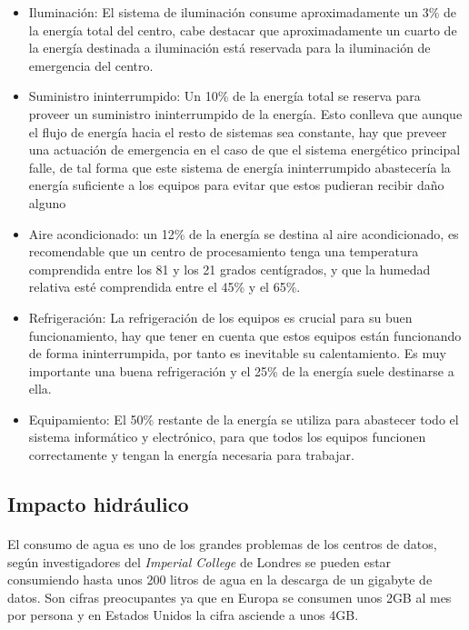 \documentclass[12pt]{article}
\begin{document}
        \begin{itemize}
        \item Iluminación: El sistema de iluminación consume aproximadamente un 3\% de la energía total del centro, cabe destacar que aproximadamente un cuarto de la energía destinada a iluminación está reservada para la iluminación de emergencia del centro.
        \item Suministro ininterrumpido: Un 10\% de la energía total se reserva para proveer un suministro ininterrumpido de la energía. Esto conlleva que aunque el flujo de energía hacia el resto de sistemas sea constante, hay que preveer una actuación de emergencia en el caso de que el sistema energético principal falle, de tal forma que este sistema de energía ininterrumpido abastecería la energía suficiente a los equipos para evitar que estos pudieran recibir daño alguno
        \item Aire acondicionado: un 12\% de la energía se destina al aire acondicionado, es recomendable que un centro de procesamiento tenga una temperatura comprendida entre los 81 y los 21 grados centígrados, y que la humedad relativa esté comprendida entre el 45\% y el 65\%.
        \item Refrigeración: La refrigeración de los equipos es crucial para su buen funcionamiento, hay que tener en cuenta que estos equipos están funcionando de forma ininterrumpida, por tanto es inevitable su calentamiento. Es muy importante una buena refrigeración y el 25\% de la energía suele destinarse a ella.
        \item Equipamiento: El 50\% restante de la energía se utiliza para abastecer todo el sistema informático y electrónico, para que todos los equipos funcionen correctamente y tengan la energía necesaria para trabajar.
        \end{itemize}
        
	  \subsection{Impacto hidráulico}
	  	\paragraph{}
		El consumo de agua es uno de los grandes problemas de los centros de datos, según investigadores del \textit{Imperial College} de Londres se pueden estar consumiendo hasta unos 200 litros de agua en la descarga de un gigabyte de datos. Son cifras preocupantes ya que en Europa se consumen unos 2GB al mes por persona y en Estados Unidos la cifra asciende a unos 4GB. 
        
\end{document}
